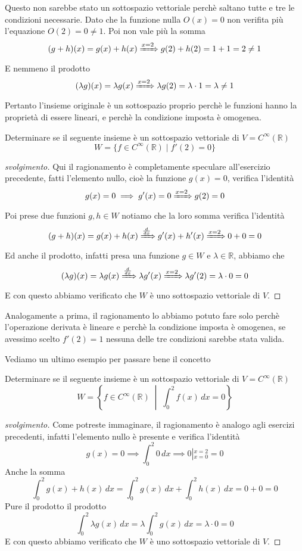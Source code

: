 \documentclass{rapport}
\begin{document}
  Questo non sarebbe stato un sottospazio vettoriale perchè saltano tutte e tre le condizioni necessarie. Dato che la funzione nulla $O(x) = 0$ non verifita più l'equazione $O(2) = 0 \neq 1$. Poi non vale più la somma
  \[
  (g+ h)(x) = g(x) + h(x) \xRightarrow{x=2} g(2) + h(2) = 1 + 1 = 2 \neq 1
  \]
   E nemmeno il prodotto 
  \[
  (\lambda g)(x) = \lambda g(x)  \xRightarrow{x=2} \lambda g(2) = \lambda\cdot 1 = \lambda \neq 1 
  \]
  Pertanto l'insieme originale è un sottospazio proprio perchè le funzioni hanno la proprietà di essere lineari, e perchè la condizione imposta è omogenea.
\begin{esercizio}{}{}
  Determinare se il seguente insieme è un sottospazio vettoriale di $V= C^{\infty}(\mathbb{R})$
  \[
  W = \{f \in C^{\infty}(\mathbb{R}) \;|\; f'(2)=0\}
  \]
\end{esercizio}
\begin{proof}[svolgimento]
  Qui il ragionamento è completamente speculare all'esercizio precedente, fatti l'elemento nullo, cioè la funzione $g(x)= 0$, verifica l'identità 
  \[
  g(x)= 0 \implies g'(x) = 0 \xRightarrow{x=2} g(2) = 0 
  \]
  Poi prese due funzioni $g, h \in W$ notiamo che la loro somma verifica l'identità
  \[
  (g+ h)(x) = g(x) + h(x) \xRightarrow{\frac{d}{dx}} g'(x) + h'(x) \xRightarrow{x=2} 0 + 0 = 0
  \]
  Ed anche il prodotto, infatti presa una funzione $g \in W$ e $\lambda \in \mathbb{R}$, abbiamo che 
  \[
  (\lambda g)(x) = \lambda g(x)  \xRightarrow{\frac{d}{dx}} \lambda g'(x) \xRightarrow{x=2} \lambda g'(2) =\lambda\cdot 0 =0  
  \]
  E con questo abbiamo verificato che $W$ è uno sottospazio vettoriale di $V$.
\end{proof}

Analogamente a prima, il ragionamento lo abbiamo potuto fare solo perchè l'operazione derivata è lineare e perchè la condizione imposta è omogenea, se avessimo scelto $f'(2) = 1$ nessuna delle tre condizioni sarebbe stata valida. 


Vediamo un ultimo esempio per passare bene il concetto 
\begin{esercizio}{}{}
  Determinare se il seguente insieme è un sottospazio vettoriale di $V= C^{\infty}(\mathbb{R})$
  \[
  W = \left\{f \in C^{\infty}(\mathbb{R}) \;\middle|\; \int_{0}^{2}f(x)\,dx=0\right\}
  \]
\end{esercizio}
\begin{proof}[svolgimento]
  Come potreste immaginare, il ragionamento è analogo agli esercizi precedenti, infatti l'elemento nullo è presente e verifica l'identità 
  \[
  g(x)= 0 \implies \int_{0}^{2}0 \,dx \implies 0 \left|^{x=2}_{x=0}\right. = 0 
  \]
  Anche la somma
  \[
  \int_{0}^{2}g(x) + h(x)\,dx = \int_{0}^{2}g(x)\,dx+ \int_{0}^{2}h(x)\,dx = 0 + 0 = 0
  \]
  Pure il prodotto il prodotto
  \[
 \int_{0}^{2} \lambda g(x)\,dx  =  \lambda  \int_{0}^{2} g(x)\,dx  = \lambda \cdot 0  = 0 
  \]
  E con questo abbiamo verificato che $W$ è uno sottospazio vettoriale di $V$.
\end{proof}
\end{document}
